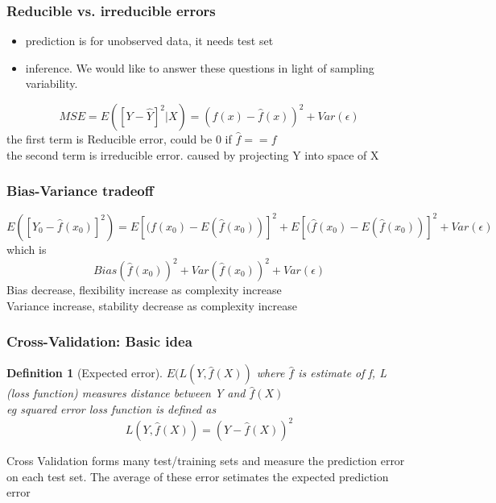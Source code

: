 \documentclass[10pt]{article}
\theoremstyle{break}
\newtheorem{defn}{Definition}[subsection]
\begin{document}
        \subsubsection{Reducible vs. irreducible errors}
            \begin{itemize}
                \item prediction is for unobserved data, it needs test set 
                \item inference. We would like to answer these questions in light of sampling variability.
            \end{itemize}
            $$MSE=E\left([Y-\hat{Y}]^2|X\right)=\left(f(x)-\hat{f}(x)\right)^2+Var(\epsilon)$$
            the first term is Reducible error, could be 0 if $\hat{f}==f$\\
            the second term is irreducible error. caused by projecting Y into space of X
        \subsubsection{Bias-Variance tradeoff}
            $$E\left([Y_0-\hat{f}(x_0)]^2\right)=E[(f(x_0)-E(\hat{f}(x_0))]^2+E[(\hat{f}(x_0)-E(\hat{f}(x_0))]^2+Var(\epsilon)$$
            which is $$Bias(\hat{f}(x_0))^2 + Var(\hat{f}(x_0))^2+Var(\epsilon)$$
            Bias decrease, flexibility increase as complexity increase\\
            Variance increase, stability decrease as complexity increase
        \subsubsection{Cross-Validation: Basic idea}
            \begin{defn}[Expected error]
                $E(L(Y,\hat{f}(X))$  where $\hat{f}$ is estimate of f, L (loss function) measures distance between Y and $\hat{f}(X)$
                \\eg squared error loss function is defined as $$L(Y,\hat{f}(X))=(Y-\hat{f}(X))^2$$
            \end{defn}
            {\Large Cross Validation forms many test/training sets and measure the prediction error on each test set. The average of these error setimates the expected prediction error}
            
\end{document}
